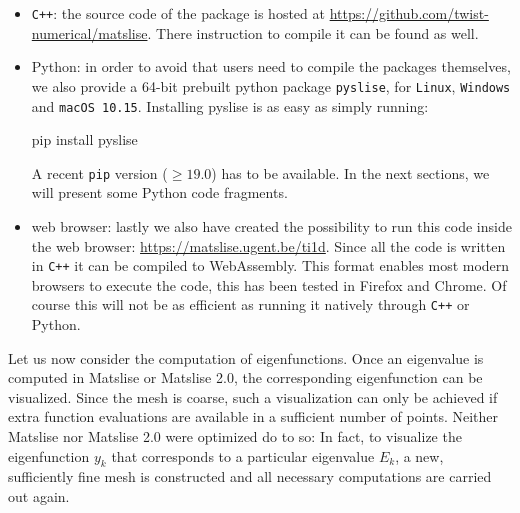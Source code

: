 \begin{itemize}
    \item \texttt{C++}: the source code of the package is hosted at \url{https://github.com/twist-numerical/matslise}. There instruction to compile it can be found as well.

    \item Python: in order to avoid that users need to compile the packages themselves, we also provide a 64-bit prebuilt python package \texttt{pyslise}, for \texttt{Linux}, \texttt{Windows} and \texttt{macOS 10.15}. Installing pyslise is as easy as simply running:
\begin{python}
pip install pyslise
\end{python}

          A recent \texttt{pip} version ($\geq 19.0$) has to be available. In the next sections, we will present some Python code fragments.

    \item web browser:
          lastly we also have created the possibility to run this code inside the web browser: \url{https://matslise.ugent.be/ti1d}. Since all the code is written in \texttt{C++} it can be compiled to WebAssembly. This format enables most modern browsers to execute the code, this has been tested in Firefox and Chrome. Of course this will not be as efficient as running it natively through \texttt{C++} or Python.

\end{itemize}


Let us now consider the computation of eigenfunctions.
Once an eigenvalue is computed in Matslise or Matslise 2.0, the corresponding eigenfunction can be visualized. Since the mesh is coarse, such a visualization can only be achieved if extra function evaluations are available in a sufficient number of points. Neither Matslise nor Matslise 2.0 were optimized do to so: In fact, to visualize the eigenfunction $y_k$ that corresponds to a particular eigenvalue $E_k$, a new, sufficiently fine mesh is constructed and all necessary computations are carried out again.

